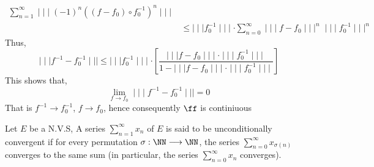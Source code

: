 \begin{enumerate}[(1)]
\begin{align*}
		    \sum_{n=1}^{\infty}  
		    \mid \mid \mid  (-1) ^n 
		    ((f-f_0) \circ  f_0^{-1}) ^n 
		    \mid \mid \mid  \\
		    & \leq       \mid \mid \mid  
		    f_0^{-1}\mid \mid \mid 
		    \cdot 
		    \sum_{n=0}^{\infty}  
		    \mid \mid \mid  f-f_0 \mid \mid \mid ^n 
		    \mid \mid \mid  f_0^{-1} \mid \mid \mid ^n 
		    \end{align*} 
		    Thus,
		    \[
		    \mid \mid \mid  f^{-1}
		    -f_0^{-1}\mid \mid \mid  
		    \leq \mid \mid \mid  f_0^{-1} \mid \mid \mid  
		    \cdot 
		    \left[ 
			    \frac{\mid \mid \mid  f-f_0 \mid \mid \mid 
			    \cdot \mid \mid \mid  f_0^{-1} \mid \mid \mid }{
		    1 - \mid \mid \mid  f-f_0 \mid \mid \mid 
	    \cdot \mid \mid \mid  f_0^{-1} \mid \mid \mid }
		    \right]
		    \]
		    This shows that, 
		    \[
			    \lim_{f \to f_0} 
			    \mid \mid \mid  
			    f^{-1} - f_0^{-1}
			    \mid \mid \mid  =
			    0
		    \]
		    That is 
		    $f^{-1} \rightarrow f_0^{-1}$,
		    $f \rightarrow f_0$, hence consequently
		    $\ff  $ is continiuous 
\end{enumerate}
\begin{definition}[]
Let $E $ be a N.V.S, A series 
$\sum_{n=1}^{\infty} x_{n}   $ 
of $E $ is said to be  unconditionally convergent
if for every permutation 
$ \sigma    : \NN \longrightarrow \NN$, the series
$\sum_{n=0}^{\infty}  x_{ \sigma (n)   } $ converges to 
 the same sum (in particular, the series $\sum_{n=0}^{\infty}  x_{n} $ 
converges).
\end{definition}

% 













